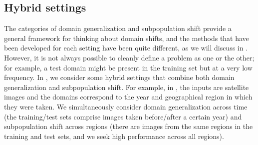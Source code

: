 \subsection{Hybrid settings}
The categories of domain generalization and subpopulation shift provide a general framework for thinking about domain shifts,
and the methods that have been developed for each setting have been quite different, as we will discuss in .
However, it is not always possible to cleanly define a problem as one or the other; for example, a test domain might be present in the training set but at a very low frequency.
In \Wilds, we consider some hybrid settings that combine both domain generalization and subpopulation shift. For example, in \FMoW, the inputs are satellite images and the domains correspond to the year and geographical region in which they were taken.
We simultaneously consider domain generalization across time (the training/test sets comprise images taken before/after a certain year) and subpopulation shift across regions (there are images from the same regions in the training and test sets, and we seek high performance across all regions).
